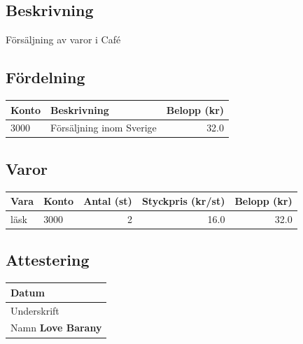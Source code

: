 \documentclass{article}
\newcommand{\namn}{Love Barany}
\newcommand{\beskrivning}{Försäljning av varor i Café}\newcommand{\fordelning}{3000 & Försäljning inom Sverige & 32.0\\}\newcommand{\varor}{läsk & 3000 & 2 & 16.0 & 32.0\\}
\begin{document}
    \subsection*{Beskrivning}
    \beskrivning

    \subsection*{Fördelning}
    \begin{tabular}{p{0.6in}p{2in}r}
        Konto & Beskrivning& Belopp (kr)\\ \hline
        \fordelning
    \end{tabular}

    \subsection*{Varor}
    \begin{longtable}[l]{llrrr}
        Vara & Konto & Antal (st) & Styckpris (kr/st) & Belopp (kr) \\ \hline
        \varor
    \end{longtable}

    \subsection*{Attestering}
    \begin{tabular}{|p{2.5in}|}
        \hline
        {\footnotesize Datum} \newline \\
        \hline
        {\footnotesize Underskrift} \newline \newline\\
        \hline
        {\footnotesize Namn} \newline \textbf{\namn} \\
        \hline
    \end{tabular}
    
\end{document}
